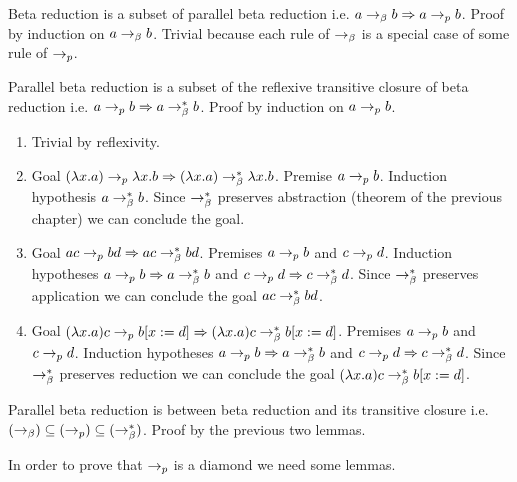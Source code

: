 \documentclass{article}
\begin{document}
\begin{lemma}
  Beta reduction is a subset of parallel beta reduction i.e.
  $a \to_\beta b \Rightarrow a \to_{p} b$.
  Proof by induction on $a \to_\beta b$. Trivial because each rule of $\to_\beta$
  is a special case of some rule of $\to_{p}$.
\end{lemma}


\begin{lemma}
  Parallel beta reduction is a subset of the reflexive transitive closure of
  beta reduction i.e.
  $a \to_{p} b \Rightarrow a \to^*_\beta b$.
  Proof by induction on $a \to_{p} b$.
  \begin{enumerate}
  \item
    Trivial by reflexivity.
  \item
    Goal $
    (\lambda x.a) \to_{p} \lambda x.b  \Rightarrow
    (\lambda x.a) \to^*_\beta \lambda x.b$.
    Premise $a \to_{p} b$.
    Induction hypothesis $a \to^*_\beta b$.
    Since $\to^*_\beta$ preserves abstraction (theorem of the previous
    chapter) we can conclude the goal.
  \item
    Goal $a c \to_{p} b d \Rightarrow a c \to^*_\beta b d$.
    Premises $a \to_{p} b$ and $c \to_{p} d$.
    Induction hypotheses $a \to_{p} b \Rightarrow a \to^*_\beta b$ and
    $c \to_{p} d \Rightarrow c \to^*_\beta d$.
    Since $\to^*_\beta$ preserves application we can conclude the goal $a c
    \to^*_\beta b d$.
  \item
    Goal $(\lambda x.a) c \to_{p} b[x:=d] \Rightarrow
    (\lambda x.a) c \to^*_\beta b[x:=d]$.
    Premises $a \to_{p} b$ and $c \to_{p} d$.
    Induction hypotheses $a \to_{p} b \Rightarrow a \to^*_\beta b$ and
    $c \to_{p} d \Rightarrow c \to^*_\beta d$.
    Since $\to^*_\beta$ preserves reduction we can conclude the goal $(\lambda x.a) c
    \to^*_\beta b[x:=d]$.
  \end{enumerate}
\end{lemma}



\begin{theorem}
  Parallel beta reduction is between beta reduction and its transitive closure
  i.e. $(\to_\beta) \subseteq (\to_{p}) \subseteq (\to^*_\beta)$.
  Proof by the previous two lemmas.
\end{theorem}




In order to prove that $\to_{p}$ is a diamond we need some lemmas.
\end{document}
